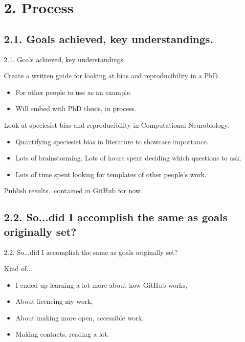 \documentclass[t]{beamer}
\begin{document}
\section{2. Process}
\subsection{2.1. Goals achieved, key understandings.}
\begin{frame}{2.1. Goals achieved, key understandings.}
	\begin{block}{Create a written guide for looking at bias and reproducibility in a PhD.}
  		\begin{itemize}    
  			\item For other people to use as an example.
  			\item Will embed with PhD thesis, in process.
  		\end{itemize}    
	\end{block}
 
	\begin{block}{Look at speciesist bias and reproducibility in Computational Neurobiology.}
  		\begin{itemize}    
  			\item Quantifying speciesist bias in literature to showcase importance.
  			\item Lots of brainstorming. Lots of hours spent deciding which questions to ask.
                \item Lots of time spent looking for templates of other people's work.
  		\end{itemize}    
	\end{block}
        \begin{block}{Publish results...contained in GitHub for now.}   
	\end{block}
\end{frame}

\subsection{2.2. So...did I accomplish the same as goals originally set?}
\begin{frame}{2.2. So...did I accomplish the same as goals originally set?}
	\begin{block}{Kind of...}
  		\begin{itemize}    
  			\item I ended up learning a lot more about how GitHub works,
  			\item About licencing my work,
                \item About making more open, accessible work,
                \item Making contacts, reading a lot.
  		\end{itemize}    
	\end{block}
\end{frame}
\end{document}
